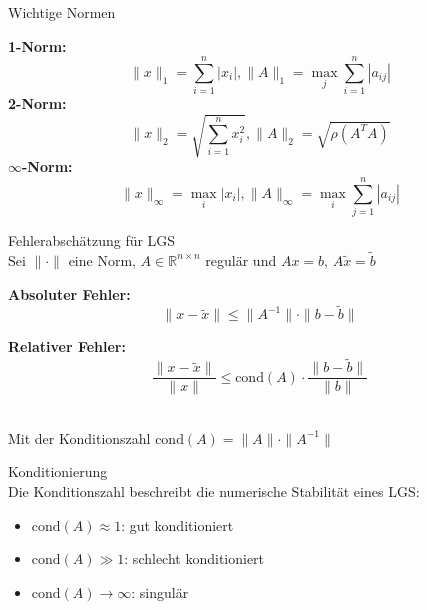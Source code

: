 \begin{concept}{Wichtige Normen}

\textbf{1-Norm:}
        $$\|x\|_1 = \sum_{i=1}^n |x_i|,
        \|A\|_1 = \max_j \sum_{i=1}^n |a_{ij}|$$
\textbf{2-Norm:}
        $$\|x\|_2 = \sqrt{\sum_{i=1}^n x_i^2}, 
        \|A\|_2 = \sqrt{\rho(A^TA)}$$
$\infty$\textbf{-Norm:}
        $$\|x\|_\infty = \max_i |x_i|, 
        \|A\|_\infty = \max_i \sum_{j=1}^n |a_{ij}|$$
\end{concept}

\begin{theorem}{Fehlerabschätzung für LGS}\\
Sei $\|\cdot\|$ eine Norm, $A \in \mathbb{R}^{n\times n}$ regulär und $Ax = b$, $A\tilde{x} = \tilde{b}$
\vspace{1mm}\\
\begin{minipage}[t]{0.47\textwidth}
    \textbf{Absoluter Fehler:}\\
    $$\|x - \tilde{x}\| \leq \|A^{-1}\| \cdot \|b - \tilde{b}\|$$
\end{minipage}
\hspace{2mm}
\begin{minipage}[t]{0.47\textwidth}
    \textbf{Relativer Fehler:}\\
    $$\frac{\|x - \tilde{x}\|}{\|x\|} \leq \text{cond}(A) \cdot \frac{\|b - \tilde{b}\|}{\|b\|}$$
\end{minipage}
\vspace{1mm}\\
Mit der Konditionszahl $\text{cond}(A) = \|A\| \cdot \|A^{-1}\|$
\end{theorem}

\begin{concept}{Konditionierung}\\
Die Konditionszahl beschreibt die numerische Stabilität eines LGS:
\begin{itemize}
    \item $\text{cond}(A) \approx 1$: gut konditioniert
    \item $\text{cond}(A) \gg 1$: schlecht konditioniert
    \item $\text{cond}(A) \to \infty$: singulär
\end{itemize}
\end{concept}

